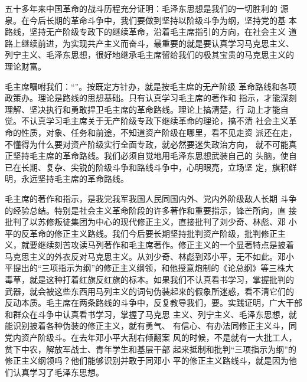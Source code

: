 \begin{hongqiarticle}
    五十多年来中国革命的战斗历程充分证明：毛泽东思想是我们的一切胜利的
    源泉。在今后长期的革命斗争中，我们要做到坚持以阶级斗争为纲，坚持党的基
    本路线，坚持无产阶级专政下的继续革命，沿着毛主席指引的方向，在社会主义
    道路上继续前进，为实现共产主义而奋斗，最重要的就是要认真学习马克思主义、
    列宁主义、毛泽东思想，很好地继承毛主席留给我们的极其宝贵的马克思主义的
    理论财富。
    
    毛主席嘱咐我们：“”。按既定方针办，就是按毛主席的无产阶级
    革命路线和各项政策办。理论是路线的思想基础。只有认真学习毛主席的著作和
    指示，才能深刻理解、坚决执行和勇敢捍卫毛主席的革命路线。理论上搞清楚，行
    动上才能自觉。不认真学习毛主席关于无产阶级专政下继续革命的理论，搞不清
    社会主义革命的性质，对象、任务和前途，不知道资产阶级在哪里，看不见走资
    派还在走，不懂得为什么要对资产阶级实行全面专政，就必然要迷失政治方向，
    就不可能真正坚持毛主席的革命路线。我们必须自觉地用毛泽东思想武装自己的
    头脑，使自已在长期、复杂、尖锐的阶级斗争和路线斗争中，心明眼亮，立场坚
    定，旗积鲜明，永远坚持毛主席的革命路线。
    
    毛主席的著作和指示，是我党我军我国人民同国内外、党内外阶级敌人长期
    斗争的经验总结。特别是社会主义革命阶段的许多著作和重要指示，锋芒所向，直
    接批判了以苏修叛徒集团为中心的现代修正主义，直接批判了刘少奇、林彪、邓
    小平的反革命的修正主义路线。我们今后要长期坚持批判资产阶级，批判修正主
    义，就要继续刻苦攻读马列著作和毛主席著作。修正主义的一个显著特点是披着
    马克思主义的外衣反对马克思主义。从刘少奇、林彪到邓小平，无不如此。邓小
    平提出的“三项指示为纲”的修正主义纲领，和他授意炮制的《论总纲》等三株大
    毒草，就是这种打着红旗反红旗的标本。如果我们不认真看书学习，掌握批判的
    武器，就会被这些东西用马列主义的词句伪装起来的假象所迷惑，看不清它们的
    反动本质。毛主席在两条路线的斗争中，反复教导我们，要。实践证明，广大干部和群众在斗争中认真看书学习，掌握了马克思
    主义、列宁主义、毛泽东思想，就能识别披着各种伪装的修正主义，就有勇气、
    有信心、有办法同修正主义斗，同党内资产阶级斗。在去年邓小平大刮右倾翻案
    风的时候，不是就有一大批工人，贫下中农，解放军战士、青年学生和基层干部
    起来抵制和批判“三项指示为纲”的修正主义纲领吗？他们能够识别并敢于同邓小
    平的修正主义路线斗，就是因为他们认真学习了毛泽东思想。
    

\end{hongqiarticle}
